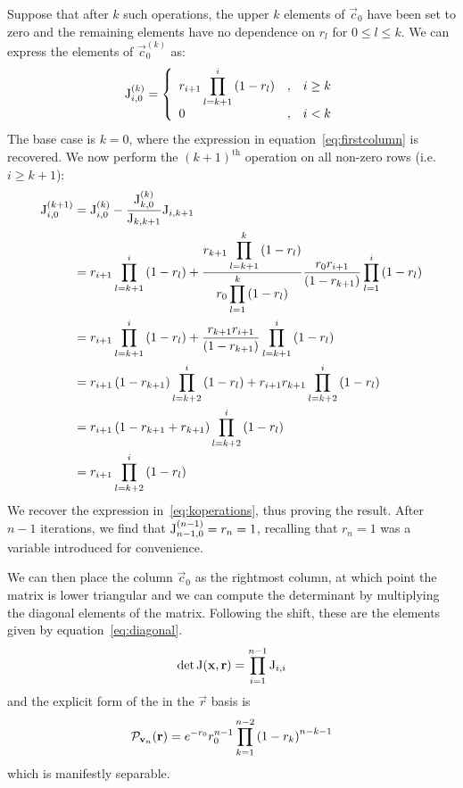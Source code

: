 Suppose that after \(k\) such operations, the upper \(k\) elements of
\(\vec{c}_{0}\) have been set to zero and the remaining elements have no
dependence on \(r_{l}\) for \(0 \leq l \leq k\). We can express the elements of
\(\vec{c}_{0}^{\left(k\right)}\) as:
\begin{equation}
  \label{eq:koperations}
  \mathrm{J}_{i,0}^{\left(k\right)} = \left\{ \begin{array}{lcl}
    r_{i+1} \displaystyle \prod_{l=k+1}^{i} \left( 1-r_{l} \right) & , &
      i \geq k \\
    0 & , & i < k
  \end{array} \right.
\end{equation}
The base case is \(k=0\), where the expression in equation~\ref{eq:firstcolumn}
is recovered. We now perform the \(\left(k+1\right)^{
\text{th}}\) operation on all non-zero rows (i.e.\ \(i \geq k+1\)):
\begin{align}
  \mathrm{J}_{i,0}^{\left(k+1\right)} &= \mathrm{J}_{i,0}^{\left(k\right)} - 
    \frac{\mathrm{J}_{k,0}^{\left(k\right)}}{\mathrm{J}_{k,k+1}} \mathrm{J}_{i,k+1} \\
  &= r_{i+1}\prod_{l=k+1}^{i} \left( 1-r_{l} \right) + \frac{\displaystyle
    r_{k+1} \prod_{
    l=k+1}^{k} \left( 1-r_{l} \right) }{\displaystyle r_{0} \prod_{l=1}^{k}
    \left( 1-r_{l} \right) } \frac{ r_{0} r_{i+1} }{ \left( 1-r_{k+1} \right) }
    \prod_{ l=1 }^{i} \left( 1-r_{l} \right) \\
  &= r_{i+1} \prod_{l=k+1}^{i} \left( 1-r_{l} \right) + \frac{ r_{k+1} r_{i+1}
    }{ \left( 1-r_{k+1} \right) } \prod_{l=k+1}^{i} \left( 1-r_{l} \right) \\
  &= r_{i+1} \left( 1-r_{k+1} \right) \prod_{l=k+2}^{i} \left( 1-r_{l} \right)
    + r_{i+1} r_{k+1} \prod_{l=k+2}^{i} \left( 1-r_{l} \right) \\
  &= r_{i+1} \left( 1-r_{k+1}+r_{k+1} \right) \prod_{l=k+2}^{i} \left( 1-r_{l}
    \right) \\
  &= r_{i+1} \prod_{l=k+2}^{i} \left( 1-r_{l} \right)
\end{align}
We recover the expression in~\ref{eq:koperations}, thus proving the result.
After \(n-1\) iterations, we find that \(\mathrm{J}_{n-1,0}^{\left(n-1\right)}=
r_{n}=1\), recalling that \(r_{n}=1\) was a variable introduced for convenience.

We can then place the column \(\vec{c}_{0}\) as the rightmost column, at which
point the matrix is lower triangular and we can compute the determinant by
multiplying the diagonal elements of the matrix. Following the shift, these are
the elements given by equation~\ref{eq:diagonal}.
\begin{equation}
  \det \mathrm{J} \!\left( \mathbf{x}, \mathbf{r} \right) = \prod_{i=1}^{n-1} \mathrm{J}_{i,i}
\end{equation}
and the explicit form of the \pdf{} in the \(\vec{r}\) basis is
\begin{equation}
  \mathcal{P}_{\mathbf{v}_n} \!\left( \mathbf{r} \right) = e^{-r_0} r_0^{n-1} \prod_{k=1}^{n-2}
  \left( 1-r_k \right)^{n-k-1}
\end{equation}
which is manifestly separable.

